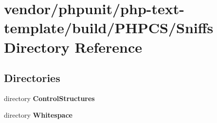 \section{vendor/phpunit/php-\/text-\/template/build/\+P\+H\+P\+C\+S/\+Sniffs Directory Reference}
\label{dir_5ca218cdb5977689ca861082c5af0ced}
\subsection*{Directories}
\begin{DoxyCompactItemize}
\item 
directory {\bf Control\+Structures}
\item 
directory {\bf Whitespace}
\end{DoxyCompactItemize}
